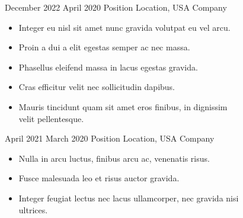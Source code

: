 
\Experience
{December 2022}
{April 2020}
{Position}
{Location, USA}
{Company}
{\begin{itemize}
      \item Integer eu nisl sit amet nunc gravida volutpat eu vel arcu.
      \item Proin a dui a elit egestas semper ac nec massa.
      \item Phasellus eleifend massa in lacus egestas gravida.
      \item Cras efficitur velit nec sollicitudin dapibus.
      \item Mauris tincidunt quam sit amet eros finibus, in dignissim
      \\ velit pellentesque.
\end{itemize}}

\vspace*{0.05 in}

\Experience
{April 2021}
{March 2020}
{Position}
{Location, USA}
{Company}
{\begin{itemize}
     \item Nulla in arcu luctus, finibus arcu ac, venenatis risus.
     \item Fusce malesuada leo et risus auctor gravida.
     \item Integer feugiat lectus nec lacus ullamcorper, nec gravida nisi
     \\ultrices.
\end{itemize}}